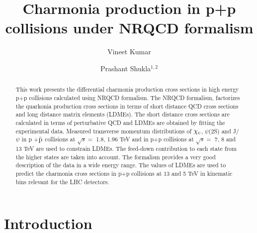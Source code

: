 \documentclass[12pt,a4paper,final]{iopart}
\begin{document}
\title[]{Charmonia production in p+p collisions under NRQCD formalism}

\author{Vineet Kumar}
\address{Nuclear Physics Division, Bhabha Atomic Research Center, Mumbai, India}
\author{Prashant Shukla$^{1,2}$}
\address{$^{1}$Nuclear Physics Division, Bhabha Atomic Research Center, Mumbai, India}
\address{$^{2}$Homi Bhabha National Institute, Anushakti Nagar, Mumbai, India}


\begin{abstract}
  This work presents the differential charmonia production cross sections in high 
  energy p+p collisions calculated  using NRQCD formalism. The NRQCD formalism, 
  factorizes the quarkonia production cross sections in terms of short distance QCD 
  cross sections and long distance matrix elements (LDMEs). The short distance cross
  sections are calculated in terms of perturbative QCD and LDMEs are obtained by 
  fitting the experimental data. Measured transverse momentum distributions of 
  $\chi_{\rm c}$, $\psi$(2S) and J/$\psi$ in p +{$\bar {\rm p}$} collisions at $\sqrt{s}=$ 1.8, 1.96 TeV 
  and in p+p collisions at $\sqrt{s}=$  7, 8 and 13 TeV are used to constrain LDMEs. The feed-down 
  contribution to each state from the higher states are taken into account.
  The formalism provides a very good description of the data in a wide energy range. 
  The values of LDMEs are used to predict the charmonia cross sections in p+p collisions 
  at 13 and 5 TeV in kinematic bins relevant for the LHC detectors. 
\end{abstract}
\maketitle


\section{Introduction}
\end{document}
